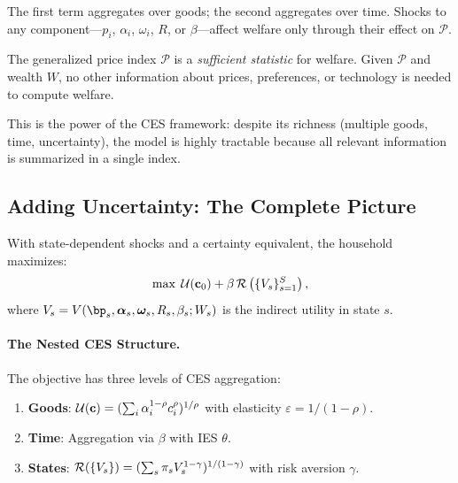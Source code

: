 The first term aggregates over goods; the second aggregates over time. Shocks to any component---$p_i$, $\alpha_i$, $\omega_i$, $R$, or $\beta$---affect welfare only through their effect on $\mathcal{P}$.

\begin{calloutnote}
The generalized price index $\mathcal{P}$ is a \emph{sufficient statistic} for welfare. Given $\mathcal{P}$ and wealth $W$, no other information about prices, preferences, or technology is needed to compute welfare.

This is the power of the CES framework: despite its richness (multiple goods, time, uncertainty), the model is highly tractable because all relevant information is summarized in a single index.
\end{calloutnote}

\subsection{Adding Uncertainty: The Complete Picture}
\label{subsec:ac-iso-uncertainty}

With state-dependent shocks and a certainty equivalent, the household maximizes:
\begin{equation}
\max \; \mathcal{U}(\mathbf{c}_0) + \beta \, \mathcal{R}\left( \{ V_s \}_{s=1}^{S} \right),
\label{eq:ac-iso-obj-full}
\end{equation}
where $V_s = V(\bp_s, \boldsymbol{\alpha}_s, \boldsymbol{\omega}_s, R_s, \beta_s; W_s)$ is the indirect utility in state $s$.

\paragraph{The Nested CES Structure.}
The objective has three levels of CES aggregation:
\begin{enumerate}[nosep]
\item \textbf{Goods}: $\mathcal{U}(\mathbf{c}) = (\sum_i \alpha_i^{1-\rho} c_i^{\rho})^{1/\rho}$ with elasticity $\varepsilon = 1/(1-\rho)$.
\item \textbf{Time}: Aggregation via $\beta$ with IES $\theta$.
\item \textbf{States}: $\mathcal{R}(\{V_s\}) = (\sum_s \pi_s V_s^{1-\gamma})^{1/(1-\gamma)}$ with risk aversion $\gamma$.
\end{enumerate}

